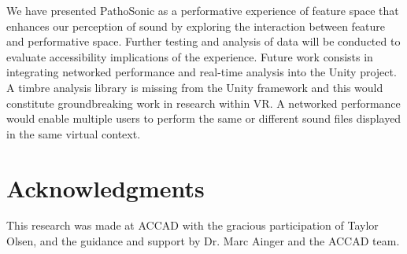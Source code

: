 \documentclass{nime-alternate}
\begin{document}
We have presented PathoSonic as a performative experience of feature space that enhances our perception of sound by exploring the interaction between feature and performative space. Further testing and analysis of data will be conducted to evaluate accessibility implications of the experience. Future work consists in integrating networked performance and real-time analysis into the Unity project. A timbre analysis library is missing from the Unity framework and this would constitute groundbreaking work in research within VR. A networked performance would enable multiple users to perform the same or different sound files displayed in the same virtual context. 

\section{Acknowledgments}

This research was made at ACCAD with the gracious participation of Taylor Olsen, and the guidance and support by Dr. Marc Ainger and the ACCAD team.











 
\end{document}
